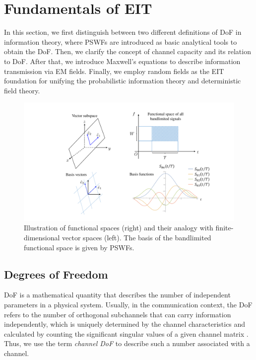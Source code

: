 \documentclass[journal,twocolumn]{IEEEtran}
\begin{document}
\section{Fundamentals of EIT}
In this section, we first distinguish between two different definitions of DoF in information theory, where PSWFs are introduced as basic analytical tools to obtain the DoF. 
Then, we clarify the concept of channel capacity and its relation to DoF. 
After that, we introduce Maxwell's equations to describe information transmission via EM fields. 
Finally, we employ random fields as the EIT foundation for unifying the probabilistic information theory and deterministic field theory. 

\begin{figure}
	\centering 
	\includegraphics[width=\linewidth]{figures/PSWF.pdf} 
	\caption{Illustration of functional spaces (right) and their analogy with finite-dimensional vector spaces (left). The basis of the bandlimited functional space is given by PSWFs. }
	\label{fig:PSWF}
\end{figure}

\subsection{Degrees of Freedom}
\label{Sec_2_Subsec_1}
DoF is a mathematical quantity that describes the number of independent parameters in a physical system. 
Usually, in the communication context, the DoF refers to the number of orthogonal subchannels that can carry information independently, which is uniquely determined by the channel characteristics and calculated by counting the significant singular values of a given channel matrix \cite{goldsmith2003capacity}. 
Thus, we use the term {{\emph{channel DoF}}} to describe such a number associated with a channel.
\end{document}
